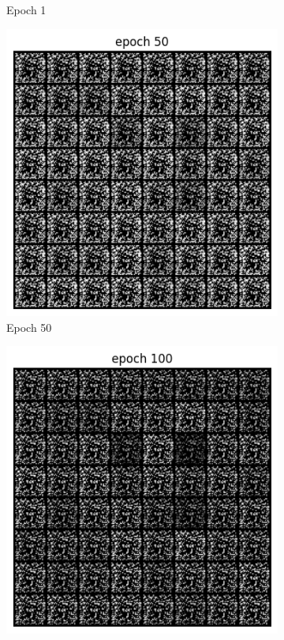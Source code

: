 \documentclass[a4paper]{article}
\theoremstyle{definition}
\newenvironment{soln}{
	\leavevmode\color{blue}\ignorespaces
}{}
\begin{document}
\begin{enumerate} [label=(\alph*)]
\begin{soln}
\begin{figure}[H]
\begin{subfigure}[b]{0.3\textwidth}
    				\caption{Epoch 1}
    			\end{subfigure}
    			\hfill
    			\begin{subfigure}[b]{0.3\textwidth}
    				\centering
    				\includegraphics[width=\textwidth]{Images/Q1/Q1b_50.png}
    				\caption{Epoch 50}
    			\end{subfigure}
    			\hfill
    			\begin{subfigure}[b]{0.3\textwidth}
    				\centering
    				\includegraphics[width=\textwidth]{Images/Q1/Q1b_100.png}

\end{subfigure}
\end{figure}
\end{soln}
\end{enumerate}
\end{document}
